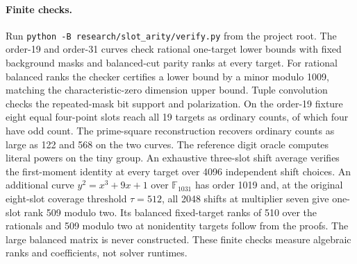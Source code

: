 \documentclass[11pt]{article}
\begin{document}
\paragraph{Finite checks.}
Run \texttt{python -B research/slot\_arity/verify.py} from the
project root. The order-19 and order-31 curves check rational
one-target lower bounds with fixed background masks and balanced-cut
parity ranks at every target. For rational balanced ranks the checker
certifies a lower bound by a minor modulo 1009, matching the
characteristic-zero dimension upper bound. Tuple convolution checks
the repeated-mask bit support and polarization. On the order-19
fixture eight equal four-point slots reach all 19 targets as ordinary
counts, of which four have odd count. The prime-square reconstruction
recovers ordinary counts as large as 122 and 568 on the two curves.
The reference digit oracle computes literal powers on the tiny group.
An exhaustive three-slot shift average verifies the first-moment
identity at every target over 4096 independent shift choices.
An additional curve
$y^2=x^3+9x+1$ over $\mathbb F_{1031}$ has order 1019 and, at the
original eight-slot coverage threshold $\tau=512$, all 2048 shifts
at multiplier seven give one-slot rank 509 modulo two. Its balanced
fixed-target ranks of 510 over the rationals and 509 modulo two at
nonidentity targets follow from the proofs. The large balanced
matrix is never constructed. These finite checks measure algebraic
ranks and coefficients, not solver runtimes.
\end{document}

